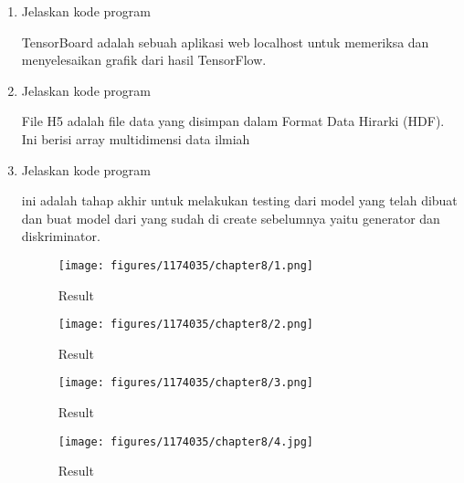 \begin{enumerate}
        \item Jelaskan kode program 
        
        TensorBoard adalah sebuah aplikasi web localhost untuk memeriksa dan menyelesaikan grafik dari hasil TensorFlow.
        
        \item Jelaskan kode program 
        
        File H5 adalah file data yang disimpan dalam Format Data Hirarki (HDF). Ini berisi array multidimensi data ilmiah
        
        \item Jelaskan kode program 
        
        ini adalah tahap akhir untuk melakukan testing dari model yang telah dibuat dan buat model dari yang sudah di create sebelumnya yaitu generator dan diskriminator.
        
        \begin{figure}[H]
        \centering
        \texttt{[image: figures/1174035/chapter8/1.png]}
        \caption{Result}
        \end{figure}
        
        \begin{figure}[H]
        \centering
        \texttt{[image: figures/1174035/chapter8/2.png]}
        \caption{Result} 
        \end{figure}
        
        \begin{figure}[H]
          \centering
          \texttt{[image: figures/1174035/chapter8/3.png]}
        \caption{Result}
 
        \end{figure}
        
        \begin{figure}[H]
        \centering
        \texttt{[image: figures/1174035/chapter8/4.jpg]}
        \caption{Result}
        \end{figure}
        
        
        \end{enumerate}